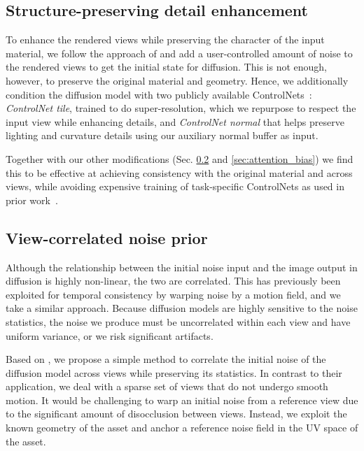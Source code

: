 
\subsection{Structure-preserving detail enhancement}
\label{sec:second-controlnet}

To enhance the rendered views while preserving the character of the input material, we follow the approach of \citet{meng2022sdedit} and add a user-controlled amount of noise to the rendered views to get the initial state for diffusion. This is not enough, however, to preserve the original material and geometry. Hence, we additionally condition the diffusion model with two publicly available ControlNets~\cite{controlnet}: \emph{ControlNet tile}, trained to do super-resolution, which we repurpose to respect the input view while enhancing details, and \emph{ControlNet normal} that helps preserve lighting and curvature details using our auxiliary normal buffer as input.

Together with our other modifications (Sec. \ref{sec:noise_warping} and \ref{sec:attention_bias}) we find this to be effective at achieving consistency with the original material and across views, while avoiding expensive training of task-specific ControlNets as used in prior work~\cite{flashtex}.






\subsection{View-correlated noise prior}
\label{sec:noise_warping}













Although the relationship between the initial noise input and the image output in diffusion is highly non-linear, the two are correlated.
This has previously been exploited for temporal consistency by warping noise by a motion field, and we take a similar approach.
Because diffusion models are highly sensitive to the noise statistics, the noise we produce must be uncorrelated within each view and have uniform variance, or we risk significant artifacts.

Based on \citet{chang2024how}, we propose a simple method to correlate the initial noise of the diffusion model across views while preserving its statistics.
In contrast to their application, we deal with a sparse set of views that do not undergo smooth motion.
It would be challenging to warp an initial noise from a reference view due to the significant amount of disocclusion between views.
Instead, we exploit the known geometry of the asset and anchor a reference noise field in the UV space of the asset.

